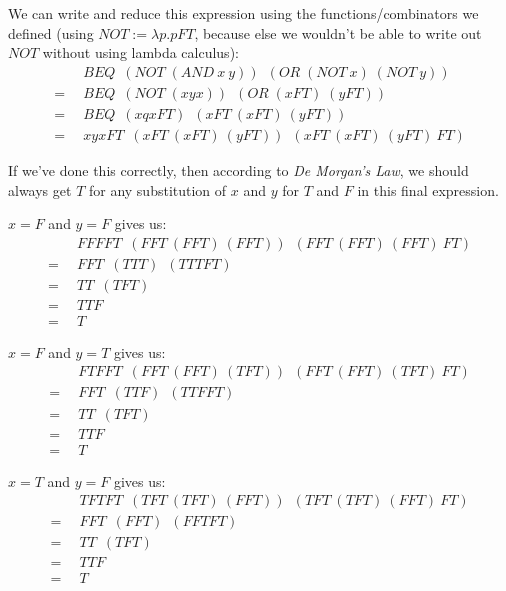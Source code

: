 \documentclass[11pt]{article}
\begin{document}
We can write and reduce this expression using the functions/combinators we
defined (using \(NOT:=\lambda p.pFT\), because else we wouldn't be able to
write out \(NOT\) without using lambda calculus):
\begin{align*}
	&\enspace BEQ\enspace
		(NOT\;(AND\:x\:y))\enspace
		(OR\;(NOT\:x)\;(NOT\:y))\\
	=&\enspace BEQ\enspace
		(NOT\;(xyx))\enspace
		(OR\;(xFT)\;(yFT))\\
	=&\enspace BEQ\enspace
		(xqxFT)\enspace
		(xFT\:(xFT)\:(yFT))\\
	=&\enspace xyxFT\enspace
		(xFT\:(xFT)\:(yFT))\enspace
		(xFT\:(xFT)\:(yFT)\:FT)
\end{align*}


If we've done this correctly, then according to \emph{De Morgan's Law}, we
should always get \(T\) for any substitution of \(x\) and \(y\) for \(T\) and
\(F\) in this final expression.

\(x=F\) and \(y=F\) gives us:
\begin{align*}
	&\enspace FFFFT\enspace
		(FFT\:(FFT)\:(FFT))\enspace
		(FFT\:(FFT)\:(FFT)\:FT)\\
	=&\enspace FFT\enspace(TTT)\enspace(TTTFT)\\
	=&\enspace TT\enspace(TFT)\\
	=&\enspace TTF\\
	=&\enspace T
\end{align*}

\(x=F\) and \(y=T\) gives us:
\begin{align*}
	&\enspace FTFFT\enspace
		(FFT\:(FFT)\:(TFT))\enspace
		(FFT\:(FFT)\:(TFT)\:FT)\\
	=&\enspace FFT\enspace(TTF)\enspace(TTFFT)\\
	=&\enspace TT\enspace(TFT)\\
	=&\enspace TTF\\
	=&\enspace T
\end{align*}

\(x=T\) and \(y=F\) gives us:
\begin{align*}
	&\enspace TFTFT\enspace
		(TFT\:(TFT)\:(FFT))\enspace
		(TFT\:(TFT)\:(FFT)\:FT)\\
	=&\enspace FFT\enspace(FFT)\enspace(FFTFT)\\
	=&\enspace TT\enspace(TFT)\\
	=&\enspace TTF\\
	=&\enspace T\\
\end{align*}
\end{document}
